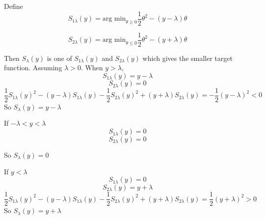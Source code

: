 \documentclass{article}
\begin{document}
Define
\[
S_{1\lambda}(y)=\textrm{arg min}_{\theta\geq0}\frac{1}{2}\theta^2-(y-\lambda)\theta
\]

\[
S_{2\lambda}(y)=\textrm{arg min}_{\theta\leq0}\frac{1}{2}\theta^2-(y+\lambda)\theta
\]

Then $S_\lambda(y)$ is one of $S_{1\lambda}(y)$ and $S_{2\lambda}(y)$  which gives the smaller target function.
Assuming $\lambda>0$. When $y>\lambda$,
\[
S_{1\lambda}(y)=y-\lambda
\]
\[
S_{2\lambda}(y)=0
\]
\[
\frac{1}{2}S_{1\lambda}(y)^2-(y-\lambda)S_{1\lambda}(y)-\frac{1}{2}S_{2\lambda}(y)^2+(y+\lambda)S_{2\lambda}(y)=-\frac{1}{2}(y-\lambda)^2<0
\]
So $S_{\lambda}(y)=y-\lambda$

If $-\lambda<y<\lambda$
\[
S_{1\lambda}(y)=0
\]
\[
S_{2\lambda}(y)=0
\]

So $S_{\lambda}(y)=0$

If $y<\lambda$
\[
S_{1\lambda}(y)=0
\]
\[
S_{2\lambda}(y)=y+\lambda
\]
\[
\frac{1}{2}S_{1\lambda}(y)^2-(y-\lambda)S_{1\lambda}(y)-\frac{1}{2}S_{2\lambda}(y)^2+(y+\lambda)S_{2\lambda}(y)=\frac{1}{2}(y+\lambda)^2>0
\]
So $S_{\lambda}(y)=y+\lambda$
\end{document}
